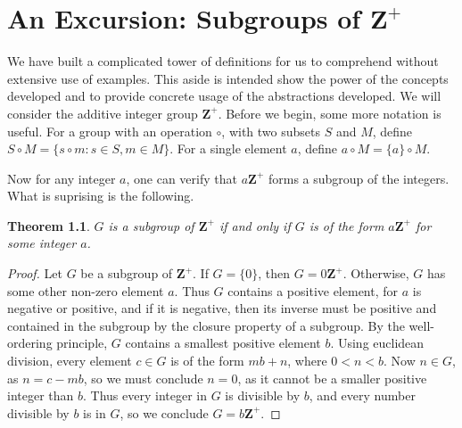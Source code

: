 \documentclass[12pt]{report}
\newtheorem{theorem}{Theorem}[section]
\begin{document}
\begin{center}
\end{center}

\chapter{An Excursion: Subgroups of $\mathbf{Z}^+$}

We have built a complicated tower of definitions for us to comprehend without extensive use of examples. This aside is intended show the power of the concepts developed and to provide concrete usage of the abstractions developed. We will consider the additive integer group $\mathbf{Z}^+$. Before we begin, some more notation is useful. For a group with an operation $\circ$, with two subsets $S$ and $M$, define $S \circ M = \{ s \circ m : s \in S, m \in M \}$. For a single element $a$, define $a \circ M = \{ a \} \circ M$.

Now for any integer $a$, one can verify that $a\mathbf{Z}^+$ forms a subgroup of the integers. What is suprising is the following.

\begin{theorem}
    $G$ is a subgroup of $\mathbf{Z}^+$ if and only if $G$ is of the form $a\mathbf{Z}^+$ for some integer $a$.
\end{theorem}
\begin{proof}
    Let $G$ be a subgroup of $\mathbf{Z}^+$. If $G = \{ 0 \}$, then $G = 0\mathbf{Z}^+$. Otherwise, $G$ has some other non-zero element $a$. Thus $G$ contains a positive element, for $a$ is negative or positive, and if it is negative, then its inverse must be positive and contained in the subgroup by the closure property of a subgroup. By the well-ordering principle, $G$ contains a smallest positive element $b$. Using euclidean division, every element $c \in G$ is of the form $mb + n$, where $0 < n < b$. Now $n \in G$,  as $n = c - mb$, so we must conclude $n = 0$, as it cannot be a smaller positive integer than $b$. Thus every integer in $G$ is divisible by $b$, and every number divisible by $b$ is in $G$, so we conclude $G = b\mathbf{Z}^+$.
\end{proof}
\end{document}
